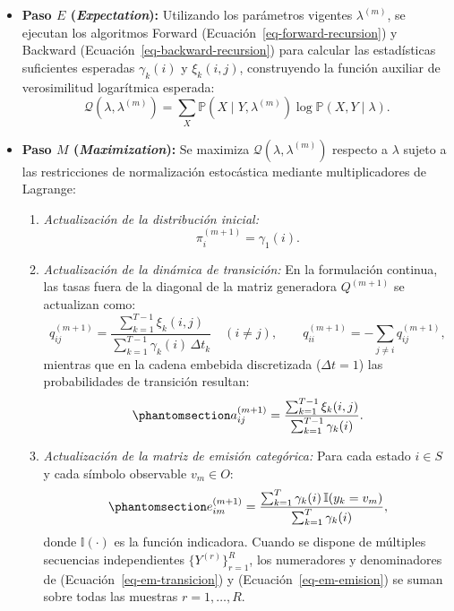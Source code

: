 \documentclass[
  spanish,
  us-letterpaper,
]{scrreprt}
\providecommand{\tightlist}{%
  \setlength{\itemsep}{0pt}\setlength{\parskip}{0pt}}
\theoremstyle{definition}
\theoremstyle{remark}
\begin{document}
\begin{itemize}
\item
  \textbf{Paso \(E\) (\emph{Expectation}):} Utilizando los parámetros
  vigentes \(\lambda^{(m)}\), se ejecutan los algoritmos Forward
  (Ecuación~\ref{eq-forward-recursion}) y Backward
  (Ecuación~\ref{eq-backward-recursion}) para calcular las estadísticas
  suficientes esperadas \(\gamma_k(i)\) y \(\xi_k(i, j)\), construyendo
  la función auxiliar de verosimilitud logarítmica esperada: \[
  \mathcal{Q}(\lambda, \lambda^{(m)}) = \sum_{X} \mathbb{P}(X \mid Y, \lambda^{(m)}) \log \mathbb{P}(X, Y \mid \lambda).
  \]
\item
  \textbf{Paso \(M\) (\emph{Maximization}):} Se maximiza
  \(\mathcal{Q}(\lambda, \lambda^{(m)})\) respecto a \(\lambda\) sujeto
  a las restricciones de normalización estocástica mediante
  multiplicadores de Lagrange:

  \begin{enumerate}
  \def\labelenumi{\arabic{enumi}.}
  \tightlist
  \item
    \emph{Actualización de la distribución inicial:} \[
    \pi_i^{(m+1)} = \gamma_1(i).
    \]
  \item
    \emph{Actualización de la dinámica de transición:} En la formulación
    continua, las tasas fuera de la diagonal de la matriz generadora
    \(Q^{(m+1)}\) se actualizan como: \[
    q_{ij}^{(m+1)} = \frac{\sum_{k=1}^{T-1} \xi_k(i, j)}{\sum_{k=1}^{T-1} \gamma_k(i)\,\Delta t_k} \quad (i \neq j), \qquad q_{ii}^{(m+1)} = -\sum_{j \neq i} q_{ij}^{(m+1)},
    \] mientras que en la cadena embebida discretizada
    (\(\Delta t = 1\)) las probabilidades de transición resultan:
    \begin{equation}\phantomsection\label{eq-em-transicion}{
    a_{ij}^{(m+1)} = \frac{\sum_{k=1}^{T-1} \xi_k(i, j)}{\sum_{k=1}^{T-1} \gamma_k(i)}.
    }\end{equation}
  \item
    \emph{Actualización de la matriz de emisión categórica:} Para cada
    estado \(i \in S\) y cada símbolo observable \(v_m \in O\):
    \begin{equation}\phantomsection\label{eq-em-emision}{
    e_{im}^{(m+1)} = \frac{\sum_{k=1}^{T} \gamma_k(i)\, \mathbb{I}(y_k = v_m)}{\sum_{k=1}^{T} \gamma_k(i)},
    }\end{equation} donde \(\mathbb{I}(\cdot)\) es la función
    indicadora. Cuando se dispone de múltiples secuencias independientes
    \(\{Y^{(r)}\}_{r=1}^R\), los numeradores y denominadores de
    (Ecuación~\ref{eq-em-transicion}) y (Ecuación~\ref{eq-em-emision})
    se suman sobre todas las muestras \(r = 1, \dots, R\).
  \end{enumerate}
\end{itemize}
\end{document}
